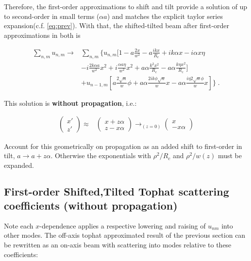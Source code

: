 \documentclass[aps,twoside,secnumarabic,balancelastpage,amsmath,amssymb,nofootinbib,hyperref=pdftex]{revtex4}
\begin{document}
Therefore, the first-order approximations to shift and tilt provide a solution of up to second-order in small terms ($\alpha a$) and matches the explicit taylor series expansion(c.f. \ref{eq:prev}). With that, the shifted-tilted beam after first-order approximations in both is 

\begin{align*}
\sum_{n,m} u_{n,m} \rightarrow &
\sum_{n,m} \lbrace		    		     u_{n,m}
	     	\Big[
        1 - a\frac{2 x}{w^2}  
        - a \frac{ikx}{R_c} 
        + i k \alpha x 
        - i\alpha x \eta 
        \\ &       
        - i \frac{2 k \alpha a}{w^2} x^2
        + i \frac{\alpha a \eta }{w^2} x^2
        + a \alpha \frac{k^2x^2}{R_c}
        - a \alpha \frac{k \eta x^2}{R_c}
    \Big]
    \\& + 
	u_{n-1,m}
	[a \frac{2 \sqrt{n}}{w} 
	\phi
	+ a\alpha \frac{2ik \phi  \sqrt{n}}{w} x	
	- a\alpha \frac{i \eta 2 \sqrt{n} \phi}{w}
	x]
	\rbrace
 \; .
\end{align*}

This solution is \textbf{without propagation}, i.e.:

\begin{align*}
\begin{pmatrix}
x' \\
z'
\end{pmatrix} 
 \approx &
	\begin{pmatrix}
x+z\alpha \\
z - x\alpha
\end{pmatrix}
\rightarrow_{(z=0)}
	\begin{pmatrix}
x \\
-x\alpha
\end{pmatrix}
\end{align*}

Account for this geometrically on propagation as an added shift to first-order in tilt, $a\rightarrow a + z\alpha$. Otherwise the exponentials with $\rho^2/R_c$ and $\rho^2/w(z)$ must be expanded.

\subsection{First-order Shifted,Tilted Tophat scattering coefficients (without propagation)}

Note each $x$-dependence applies a respective lowering and raising of $u_{nm}$ into other modes.
The off-axis tophat approximated result of the previous section can be rewritten as an on-axis beam with scattering into modes relative to these coefficients:
\end{document}
